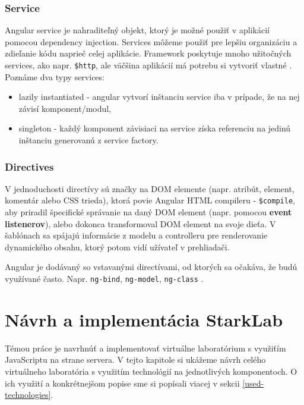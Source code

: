 \subsubsection{Service}
Angular service je nahraditeľný objekt, ktorý je možné použiť v aplikácií pomocou dependency injection. Services môžeme použiť pre lepšiu organizáciu a zdieľanie kódu naprieč celej aplikácie. Framework poskytuje mnoho užitočných services, ako napr. \verb|$http|, ale väčšina aplikácií má potrebu si vytvoriť vlastné \cite{angular-docs}.
Poznáme dva typy services:
\begin{itemize}
\item lazily instantiated - angular vytvorí inštanciu service iba v prípade, že na nej závisí komponent/modul,
\item singleton - každý komponent závisiaci na service získa referenciu na jedinú inštanciu generovanú z service factory.
\end{itemize}

\subsubsection{Directives}
V jednoduchosti directívy sú značky na DOM elemente (napr. atribút, element, komentár alebo CSS trieda), ktorá povie Angular HTML compileru - \verb|$compile|, aby priradil špecifické správanie na daný DOM element (napr. pomocou \textbf{event listenerov}), alebo dokonca transformoval DOM element na svoje dieťa. V šablónach sa spájajú informácie z modelu a controlleru pre renderovanie dynamického obsahu, ktorý potom vidí užívateľ v prehliadači.

Angular je dodávaný so vstavanými directívami, od ktorých sa očakáva, že budú využívané často. Napr. \verb|ng-bind|, \verb|ng-model|, \verb|ng-class| \cite{angular-docs}.


\section{Návrh a implementácia StarkLab}
\indent Témou práce je navrhnúť a implementovať virtuálne laboratórium s využiťím JavaScriptu na strane servera. V tejto kapitole si ukážeme návrh celého virtuálneho laboratória s využitím technológií na jednotlivých komponentoch. O ich využití a konkrétnejšom popise sme si popísali viacej v sekcii \ref{used-technologies}.

